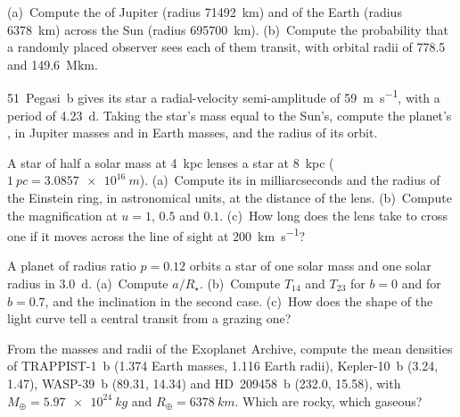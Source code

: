 \begin{exercise}[$\star$]\label{exo:b3:exoplanets:2}
(a)~Compute the  of Jupiter (radius \qty{71492}{km}) and of
the Earth (radius \qty{6378}{km}) across the Sun (radius
\qty{695700}{km}). (b)~Compute the probability that a randomly placed
observer sees each of them transit, with orbital radii of \num{778.5}
and \qty{149.6}{\mega km}.
\end{exercise}

\begin{exercise}[$\star$]\label{exo:b3:exoplanets:3}
51~Pegasi~b gives its star a radial-velocity semi-amplitude of
\qty{59}{m.s^{-1}}, with a period of \qty{4.23}{d}. Taking the star's
mass equal to the Sun's, compute the planet's , in Jupiter
masses and in Earth masses, and the radius of its orbit.
\end{exercise}

\begin{exercise}[$\star$]\label{exo:b3:exoplanets:4}
A star of half a solar mass at \qty{4}{kpc} lenses a star at
\qty{8}{kpc} ($\qty{1}{pc} = \qty{3.0857e16}{m}$). (a)~Compute its
 in milliarcseconds and the radius of the Einstein ring,
in astronomical units, at the distance of the lens. (b)~Compute the
magnification at $u = 1$, $0.5$ and $0.1$. (c)~How long does the lens take
to cross one  if it moves across the line of sight at
\qty{200}{km.s^{-1}}?
\end{exercise}

\begin{exercise}[$\star\star$]\label{exo:b3:exoplanets:5}
A planet of radius ratio $p = 0.12$ orbits a star of one solar mass and
one solar radius in \qty{3.0}{d}. (a)~Compute $a/R_\star$. (b)~Compute
$T_{14}$ and $T_{23}$ for $b = 0$ and for $b = 0.7$, and the inclination
in the second case. (c)~How does the shape of the light curve tell a
central transit from a grazing one?
\end{exercise}

\begin{exercise}[$\star\star$]\label{exo:b3:exoplanets:6}
From the masses and radii of the Exoplanet Archive, compute the mean
densities of TRAPPIST-1~b (1.374 Earth masses, 1.116 Earth radii),
Kepler-10~b (3.24, 1.47), WASP-39~b (89.31, 14.34) and HD~209458~b (232.0,
15.58), with $M_\oplus = \qty{5.97e24}{kg}$ and $R_\oplus =
\qty{6378}{km}$. Which are rocky, which gaseous?
\end{exercise}

